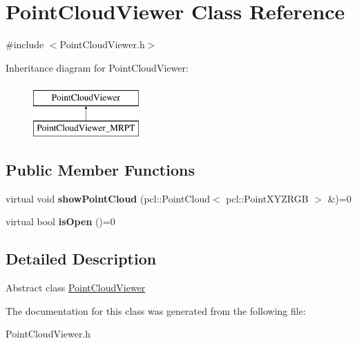 \hypertarget{class_point_cloud_viewer}{
\section{PointCloudViewer Class Reference}
\label{class_point_cloud_viewer}
}


{\ttfamily \#include $<$PointCloudViewer.h$>$}

Inheritance diagram for PointCloudViewer:\begin{figure}[H]
\begin{center}
\leavevmode
\includegraphics[height=2.000000cm]{class_point_cloud_viewer}
\end{center}
\end{figure}
\subsection*{Public Member Functions}
\begin{DoxyCompactItemize}
\item 
\hypertarget{class_point_cloud_viewer_a815f222fe31422c9230a1ecb1c306f15}{
virtual void {\bfseries showPointCloud} (pcl::PointCloud$<$ pcl::PointXYZRGB $>$ \&)=0}
\label{class_point_cloud_viewer_a815f222fe31422c9230a1ecb1c306f15}

\item 
\hypertarget{class_point_cloud_viewer_a10f36af1f2c77cdc68911c0b76fb1125}{
virtual bool {\bfseries isOpen} ()=0}
\label{class_point_cloud_viewer_a10f36af1f2c77cdc68911c0b76fb1125}

\end{DoxyCompactItemize}


\subsection{Detailed Description}
Abstract class \hyperlink{class_point_cloud_viewer}{PointCloudViewer} 

The documentation for this class was generated from the following file:\begin{DoxyCompactItemize}
\item 
PointCloudViewer.h\end{DoxyCompactItemize}
